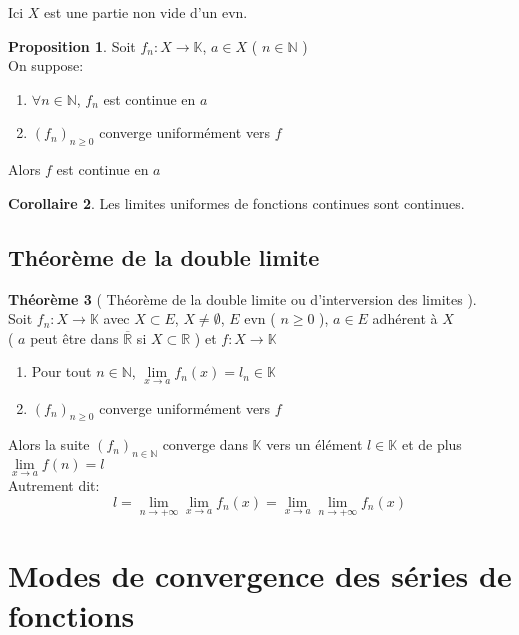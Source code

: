 \documentclass[10pt,a4paper]{article}
\theoremstyle{definition}
\newtheorem{proposition}{Proposition}[section]
\newtheorem{theorem}[proposition]{Théorème}
\newtheorem{corollaire}[proposition]{Corollaire}
\begin{document}
\noindent Ici $X$ est une partie non vide d'un evn.

\begin{proposition}
    Soit $f_n: X \to \mathbb{K}$, $a \in X$ ( $n \in \mathbb{N}$ ) \\
    On suppose:
    \begin{enumerate}
        \item $\forall n \in \mathbb{N}$, $f_n$ est continue en $a$
        \item $(f_n)_{n \geq 0}$ converge uniformément vers $f$
    \end{enumerate}
    Alors $f$ est continue en $a$
\end{proposition}
\begin{corollaire}
    Les limites uniformes de fonctions continues sont continues.
\end{corollaire}

\subsection{Théorème de la double limite}
\begin{theorem}[ Théorème de la double limite ou d'interversion des limites ]
    \hfill \\
    Soit $f_n: X \to \mathbb{K}$ avec $X \subset E$, $X \neq \emptyset$, $E$ evn ( $n \geq 0$ ), $a \in E$ adhérent à $X$ \\ 
    ( $a$ peut être dans $\overline{\mathbb{R}}$ si $X \subset \mathbb{R}$ ) et $f: X \to \mathbb{K}$
    \begin{enumerate}
        \item Pour tout $n \in \mathbb{N}$, $\lim\limits_{x \to a} f_n(x) = l_n \in \mathbb{K}$
        \item $(f_n)_{n \geq 0}$ converge uniformément vers $f$
    \end{enumerate}
    Alors la suite $(f_n)_{n \in \mathbb{N}}$ converge dans $\mathbb{K}$ vers un élément $l \in \mathbb{K}$ et de plus $\lim\limits_{x \to a}f(n) = l$ \\
    Autrement dit:
    \[ l = \lim_{n \to +\infty} \lim_{x \to a} f_n(x) = \lim_{x \to a} \lim_{n \to +\infty} f_n(x)\]
\end{theorem}

\section{Modes de convergence des séries de fonctions}
\end{document}
